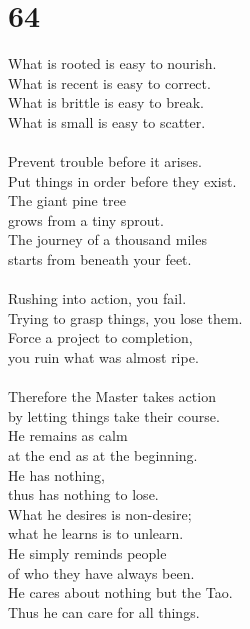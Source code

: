 \documentclass[b5paper, 12pt, oneside]{book}
\begin{document}
\chapter*{64}
What is rooted is easy to nourish.\\
What is recent is easy to correct.\\
What is brittle is easy to break.\\
What is small is easy to scatter.\\
\\
Prevent trouble before it arises.\\
Put things in order before they exist.\\
The giant pine tree\\
grows from a tiny sprout.\\
The journey of a thousand miles\\
starts from beneath your feet.\\
\\
Rushing into action, you fail.\\
Trying to grasp things, you lose them.\\
Force a project to completion,\\
you ruin what was almost ripe.\\
\\
Therefore the Master takes action\\
by letting things take their course.\\
He remains as calm\\
at the end as at the beginning.\\
He has nothing,\\
thus has nothing to lose.\\
What he desires is non-desire;\\
what he learns is to unlearn.\\
He simply reminds people\\
of who they have always been.\\
He cares about nothing but the Tao.\\
Thus he can care for all things.
\end{document}
